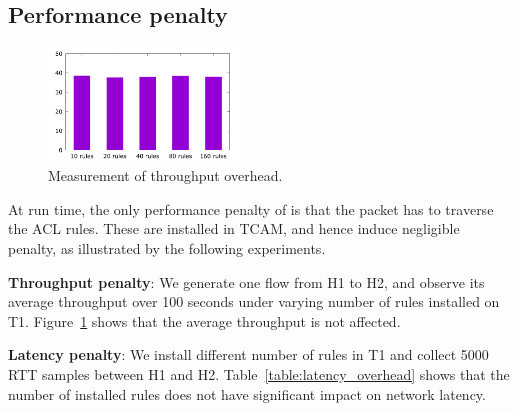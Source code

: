\subsection{Performance penalty}\label{subsec:exp_performanceoverhead}

\begin{figure}
	\centering
	\includegraphics[width=0.45\textwidth] {figs/overhead_avgthrpt}
	\caption{Measurement of throughput overhead.}\label{fig:thrpt_overhead}
\end{figure}

\begin{table}[t]
	\centering
	\caption{Measurement of latency overhead.}
	\label{table:latency_overhead}
\end{table}

At run time, the only performance penalty of \sysname{} is that the packet has
to traverse the ACL rules. These are installed in TCAM, and hence induce
negligible penalty, as illustrated by the following experiments.

\textbf{Throughput penalty}: We generate one flow from H1 to H2, and observe
its average throughput over 100 seconds under varying number of \sysname{} rules
installed on T1. Figure~\ref{fig:thrpt_overhead} shows that the average
throughput is not affected.

\textbf{Latency penalty}: We install different number of \sysname{} rules in T1
and collect 5000 RTT samples between H1 and H2.
Table~\ref{table:latency_overhead} shows that the number of installed rules does
not have significant impact on network latency.
